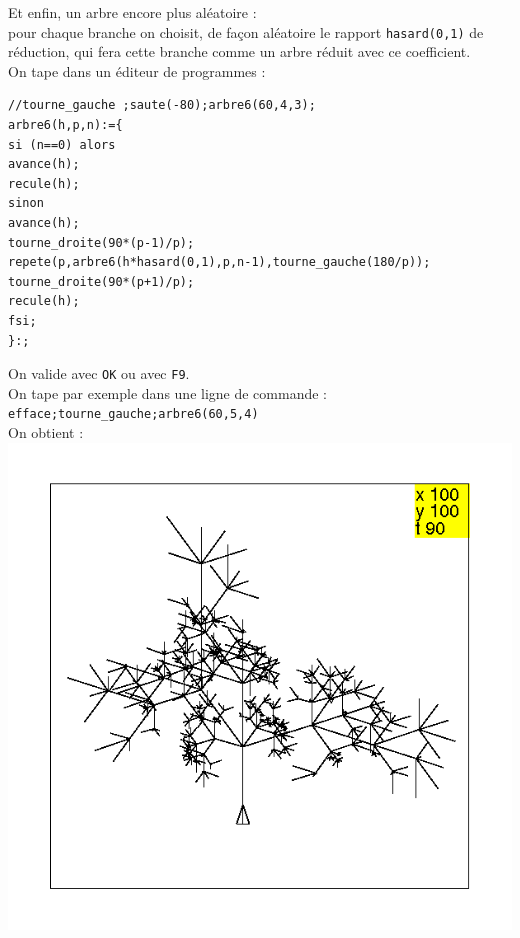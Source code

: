 \documentclass[a4paper,11pt]{book}
\begin{document}
Et enfin, un arbre encore plus al\'eatoire : \\
pour chaque branche on choisit, de fa\c{c}on al\'eatoire le rapport 
{\tt hasard(0,1)} de r\'eduction, qui fera cette branche comme un arbre 
r\'eduit avec ce coefficient.\\
On tape dans un \'editeur de programmes :
\begin{verbatim}
//tourne_gauche ;saute(-80);arbre6(60,4,3);
arbre6(h,p,n):={
si (n==0) alors
avance(h);
recule(h);
sinon
avance(h);
tourne_droite(90*(p-1)/p);
repete(p,arbre6(h*hasard(0,1),p,n-1),tourne_gauche(180/p));
tourne_droite(90*(p+1)/p);
recule(h);
fsi;
}:;
\end{verbatim}
On valide avec {\tt OK} ou avec {\tt F9}.\\
On tape par exemple dans une ligne de commande :\\
{\tt efface;tourne\_gauche;arbre6(60,5,4)}\\
On obtient :\\
\includegraphics[width=\textwidth]{tortarb6}\\
\end{document}
